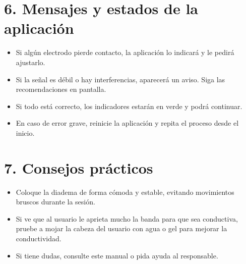 \section*{6. Mensajes y estados de la aplicación}
\begin{itemize}
    \item Si algún electrodo pierde contacto, la aplicación lo indicará y le pedirá ajustarlo.
    \item Si la señal es débil o hay interferencias, aparecerá un aviso. Siga las recomendaciones en pantalla.
    \item Si todo está correcto, los indicadores estarán en verde y podrá continuar.
    \item En caso de error grave, reinicie la aplicación y repita el proceso desde el inicio.
\end{itemize}

\section*{7. Consejos prácticos}
\begin{itemize}
    \item Coloque la diadema de forma cómoda y estable, evitando movimientos bruscos durante la sesión.
    \item Si ve que al usuario le aprieta mucho la banda para que sea conductiva, pruebe a mojar la cabeza del usuario con agua o gel para mejorar la conductividad.
    \item Si tiene dudas, consulte este manual o pida ayuda al responsable.
\end{itemize}
